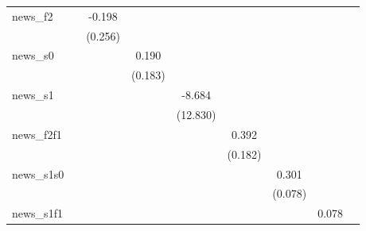 {\begin{tabular}{l*{8}{c}}
\addlinespace
news\_f2     &                     &      -0.198         &                     &                     &                     &                     &                     &                     \\
            &                     &     (0.256)         &                     &                     &                     &                     &                     &                     \\
\addlinespace
news\_s0     &                     &                     &       0.190         &                     &                     &                     &                     &                     \\
            &                     &                     &     (0.183)         &                     &                     &                     &                     &                     \\
\addlinespace
news\_s1     &                     &                     &                     &      -8.684         &                     &                     &                     &                     \\
            &                     &                     &                     &    (12.830)         &                     &                     &                     &                     \\
\addlinespace
news\_f2f1   &                     &                     &                     &                     &       0.392\sym{**} &                     &                     &                     \\
            &                     &                     &                     &                     &     (0.182)         &                     &                     &                     \\
\addlinespace
news\_s1s0   &                     &                     &                     &                     &                     &       0.301\sym{***}&                     &                     \\
            &                     &                     &                     &                     &                     &     (0.078)         &                     &                     \\
\addlinespace
news\_s1f1   &                     &                     &                     &                     &                     &                     &       0.078         &                     \\

\end{tabular}}
